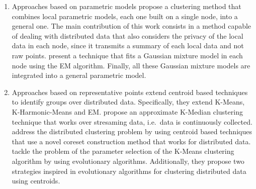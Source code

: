 \documentclass[10pt]{article}
\begin{document}
\begin{enumerate}
\item Approaches based on parametric models
\cite{MG03} propose a clustering method that combines local parametric models, each one built on a single node, into a general one. The main contribution of this work consists in a method capable of dealing with distributed data that also considers the privacy of the local data in each node, since it transmits a summary of each local data and not raw points.
\cite{KKPS05} present a technique that fits a Gaussian mixture model in each node using the EM algorithm. Finally, all these Gaussian mixture models are integrated into a general parametric model.

\item Approaches based on representative points
\cite{FZ00} extend centroid based techniques to identify groups over distributed data. Specifically, they extend K-Means, K-Harmonic-Means and EM.
\cite{ZLW08} propose an approximate K-Median clustering technique that works over stresaming data, i.e.\ data is continuously collected. 
\cite{BEL13} address the distributed clustering problem by using centroid based techniques that use a novel coreset construction method that works for distributed data.
\cite{NC14} tackle the problem of the parameter selection of the K-Means clustering algorithm by using evolutionary algorithms. Additionally, they propose two strategies inspired in evolutionary algorithms for clustering distributed data using centroids. 


\end{enumerate}
\end{document}

